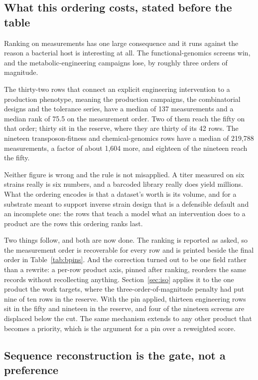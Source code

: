 \subsection{What this ordering costs, stated before the table}\label{sec:cost}

Ranking on measurements has one large consequence and it runs against the reason a
bacterial host is interesting at all. The functional-genomics screens win, and the
metabolic-engineering campaigns lose, by roughly three orders of magnitude.

The thirty-two rows that connect an explicit engineering intervention to a production
phenotype, meaning the production campaigns, the combinatorial designs and the tolerance
series, have a median of 137 measurements and a median rank of 75.5 on the measurement
order. Two of them reach the fifty on that order; thirty sit in the reserve, where they
are thirty of its 42 rows. The nineteen transposon-fitness and chemical-genomics rows
have a median of 219,788 measurements, a factor of about 1,604 more, and eighteen of the
nineteen reach the fifty.

Neither figure is wrong and the rule is not misapplied. A titer measured on six strains
really is six numbers, and a barcoded library really does yield millions. What the ordering
encodes is that a dataset's worth is its volume, and for a substrate meant to support
inverse strain design that is a defensible default and an incomplete one: the rows that
teach a model what an intervention does to a product are the rows this ordering ranks last.

Two things follow, and both are now done. The ranking is reported as asked, so the
measurement order is recoverable for every row and is printed beside the final order in
Table~\ref{tab:bpins}. And the correction turned out to be one field rather than a
rewrite: a per-row product axis, pinned after ranking, reorders the same records without
recollecting anything. Section~\ref{sec:iso} applies it to the one product the work
targets, where the three-order-of-magnitude penalty had put nine of ten rows in the
reserve. With the pin applied, thirteen engineering rows sit in the fifty and nineteen in
the reserve, and four of the nineteen screens are displaced below the cut. The same
mechanism extends to any other product that becomes a priority, which is the argument for
a pin over a reweighted score.

\subsection{Sequence reconstruction is the gate, not a preference}

